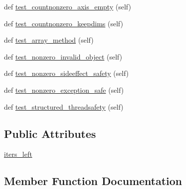 \begin{DoxyCompactItemize}
def \hyperlink{classnumpy_1_1core_1_1tests_1_1test__numeric_1_1TestNonzero_a3db3a2a8127ed1f272ce5cde715f2aa0}{test\+\_\+countnonzero\+\_\+axis\+\_\+empty} (self)
\item 
def \hyperlink{classnumpy_1_1core_1_1tests_1_1test__numeric_1_1TestNonzero_a2c6ae4e4d3c56ba104aeb7d866d66348}{test\+\_\+countnonzero\+\_\+keepdims} (self)
\item 
def \hyperlink{classnumpy_1_1core_1_1tests_1_1test__numeric_1_1TestNonzero_a8c21aedac7332e15265afaf70204fa23}{test\+\_\+array\+\_\+method} (self)
\item 
def \hyperlink{classnumpy_1_1core_1_1tests_1_1test__numeric_1_1TestNonzero_a7296016d48e0b1b17bc042a070a195c1}{test\+\_\+nonzero\+\_\+invalid\+\_\+object} (self)
\item 
def \hyperlink{classnumpy_1_1core_1_1tests_1_1test__numeric_1_1TestNonzero_ab1c0324677f54382a331364715552f83}{test\+\_\+nonzero\+\_\+sideeffect\+\_\+safety} (self)
\item 
def \hyperlink{classnumpy_1_1core_1_1tests_1_1test__numeric_1_1TestNonzero_a523e9761303d94a7fd0aff6276b4784d}{test\+\_\+nonzero\+\_\+exception\+\_\+safe} (self)
\item 
def \hyperlink{classnumpy_1_1core_1_1tests_1_1test__numeric_1_1TestNonzero_acdebc7da3d1efc62c8d9b0b45b1949a6}{test\+\_\+structured\+\_\+threadsafety} (self)
\end{DoxyCompactItemize}
\subsection*{Public Attributes}
\begin{DoxyCompactItemize}
\item 
\hyperlink{classnumpy_1_1core_1_1tests_1_1test__numeric_1_1TestNonzero_aad095b6c5cbf7aba66849e002cb49ba6}{iters\+\_\+left}
\end{DoxyCompactItemize}


\subsection{Member Function Documentation}
\mbox{\label{classnumpy_1_1core_1_1tests_1_1test__numeric_1_1TestNonzero_a8c21aedac7332e15265afaf70204fa23}} 
